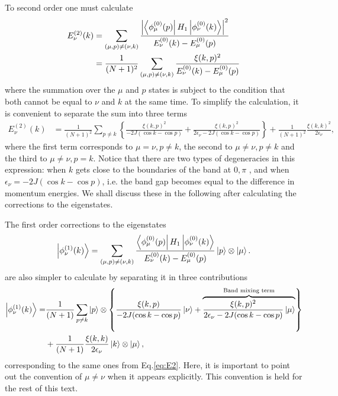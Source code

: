 \documentclass{article}
\begin{document}
To second order one must calculate
\begin{align}
    E_{\nu}^{(2)}(k) & = \sum_{(\mu,p)\neq(\nu,k)} \frac{\left|\bra{\phi^{(0)}_\mu (p)}H_1 \ket{\phi^{(0)}_\nu (k)}\right|^2}{ E_{\nu}^{(0)}(k) -  E_{\mu}^{(0)}(p)}\\
    & = \frac{1}{(N+1)^2}\sum_{(\mu,p)\neq(\nu,k)} \frac{ \xi(k,p)^2}{ E_{\nu}^{(0)}(k) -  E_{\mu}^{(0)}(p)}
\end{align}
where the summation over the $\mu$ and $p$ states is subject to the condition that 
both cannot be equal to $\nu$ and $k$ at the same time. To simplify the calculation,
 it is convenient to separate the sum into three terms
\begin{align}\label{eq:E2}
    E_{\nu}^{(2)}(k) & = \frac{1}{(N+1)^2}\sum_{p\neq k} \left \{ \frac{ \xi(k,p)^2}{ -2J( \cos k - \cos p ) } +  \frac{ \xi(k,p)^2}{ 2\epsilon_\nu -2J( \cos k - \cos p ) } \right \} + \frac{1}{(N+1)^2} \frac{\xi(k,k)^2}{2\epsilon_\nu},
\end{align}
where the first term corresponds to $\mu = \nu, p\neq k$, the second to $\mu \neq \nu, p\neq k$ and the third to $\mu \neq \nu, p = k$. Notice that there are two types of degeneracies in this expression: when $k$ gets close to the boundaries of the band at $0, \pi$ , and when $\epsilon_\nu = -2 J( \cos k -\cos p)$, i.e. the band gap becomes equal to the difference in momentum energies. We shall discuss these in the following after calculating the corrections to the eigenstates. 

The first order corrections to the eigenstates 
\begin{align}
    \ket{\phi_\nu^{(1)} (k)} = \sum_{(\mu,p)\neq(\nu,k)} \frac{\bra{\phi^{(0)}_\mu (p)}H_1 \ket{\phi^{(0)}_\nu (k)}}{ E_{\nu}^{(0)}(k) -  E_{\mu}^{(0)}(p)} \ket{p}\otimes \ket{\mu}.
\end{align} 
are also simpler to calculate by separating it in three contributions
\begin{align}\label{eq:psi_1}
    \ket{\phi_\nu^{(1)} (k)} = & \frac{1}{(N+1)}\sum_{p\neq k} \ket{p}\otimes \left \{ \frac{ \xi(k,p)}{ -2J( \cos k - \cos p ) } \ket{\nu} + \overbrace{\frac{ \xi(k,p)^2}{ 2\epsilon_\nu -2J( \cos k - \cos p )} \ket{\mu}}^{\text{Band mixing term}} \right \} \nonumber \\ 
    & + \frac{1}{(N+1)} \frac{\xi(k,k)}{2\epsilon_\nu} \ket{k}\otimes\ket{\mu},
\end{align}
corresponding to the same ones from Eq.\eqref{eq:E2}. Here, it is important to point out the convention of $\mu \neq \nu$ when it appears explicitly. This convention is held for the rest of this text.
\end{document}
